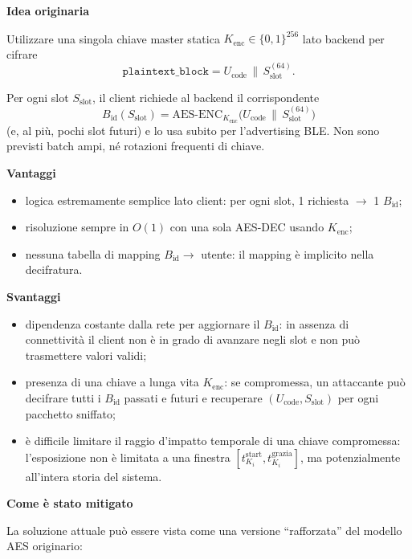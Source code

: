 \documentclass[a4paper,11pt]{article}
\begin{document}
\textbf{Idea originaria}

Utilizzare una singola chiave master statica \(K_{\text{enc}} \in \{0,1\}^{256}\) lato backend per
cifrare
\[
  \texttt{plaintext\_block}
  = U_{\text{code}} \,\|\, S_{\text{slot}}^{(64)}.
\]

Per ogni slot \(S_{\text{slot}}\), il client richiede al backend il corrispondente
\[
  B_{\text{id}}(S_{\text{slot}})
  = \mathrm{AES\text{-}ENC}_{K_{\text{enc}}}
  \bigl(U_{\text{code}} \,\|\, S_{\text{slot}}^{(64)}\bigr)
\]
(e, al più, pochi slot futuri) e lo usa subito per l'advertising BLE. Non sono previsti batch
ampi, né rotazioni frequenti di chiave.

\textbf{Vantaggi}

\begin{itemize}[nosep]
  \item logica estremamente semplice lato client: per ogni slot, 1 richiesta \(\to\) 1 \(B_{\text{id}}\);
  \item risoluzione sempre in \(O(1)\) con una sola AES-DEC usando \(K_{\text{enc}}\);
  \item nessuna tabella di mapping \(B_{\text{id}} \to\) utente: il mapping è implicito nella
        decifratura.
\end{itemize}

\textbf{Svantaggi}

\begin{itemize}[nosep]
  \item dipendenza costante dalla rete per aggiornare il \(B_{\text{id}}\): in assenza di
        connettività il client non è in grado di avanzare negli slot e non può trasmettere valori
        validi;
  \item presenza di una chiave a lunga vita \(K_{\text{enc}}\): se compromessa, un attaccante può
        decifrare tutti i \(B_{\text{id}}\) passati e futuri e recuperare
        \((U_{\text{code}}, S_{\text{slot}})\) per ogni pacchetto sniffato;
  \item è difficile limitare il raggio d'impatto temporale di una chiave compromessa: l’esposizione
        non è limitata a una finestra \([t_{K_i}^{\text{start}}, t_{K_i}^{\text{grazia}}]\), ma
        potenzialmente all’intera storia del sistema.
\end{itemize}

\textbf{Come è stato mitigato}

La soluzione attuale può essere vista come una versione ``rafforzata'' del modello AES originario:
\end{document}
